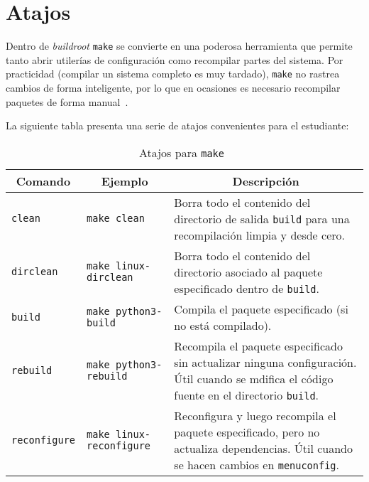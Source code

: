 %
%

\section{Atajos}%
\label{sec:shortcuts}

Dentro de \emph{buildroot} \texttt{make} se convierte en una poderosa herramienta que permite tanto abrir utilerías de configuración como recompilar partes del sistema.
Por practicidad (compilar un sistema completo es muy tardado), \texttt{make} no rastrea cambios de forma inteligente, por lo que en ocasiones es necesario recompilar paquetes de forma manual~.

\noindent
La siguiente tabla presenta una serie de atajos convenientes para el estudiante:

\begin{table}[H]
	\centering
	\caption{Atajos para \texttt{make}~}%
	\label{tab:make-build-shortcuts}
	\begin{tabularx}{0.9\textwidth}{l l X}
		\toprule
		\multicolumn{1}{c}{\bfseries Comando}&
		\multicolumn{1}{c}{\bfseries Ejemplo}&
		\multicolumn{1}{c}{\bfseries Descripción}\\
		\midrule
		\texttt{clean}       & \texttt{make clean}           &
			Borra todo el contenido del directorio de salida \texttt{build} para una recompilación limpia y desde cero.\\[2mm]
		\texttt{dirclean}    & \texttt{make linux-dirclean}  &
			Borra todo el contenido del directorio asociado al paquete especificado dentro de \texttt{build}.\\[8mm]

		\texttt{build}       & \texttt{make python3-build}   &
			Compila el paquete especificado (si no está compilado).\\[2mm]
		\texttt{rebuild}     & \texttt{make python3-rebuild} &
			Recompila el paquete especificado sin actualizar ninguna configuración.
			Útil cuando se mdifica el código fuente en el directorio \texttt{build}.\\[2mm]
		\texttt{reconfigure} & \texttt{make linux-reconfigure} &
			Reconfigura y luego recompila el paquete especificado, pero no actualiza dependencias.
			Útil cuando se hacen cambios en \texttt{menuconfig}.\\[2mm]
		\bottomrule
	\end{tabularx}
\end{table}

